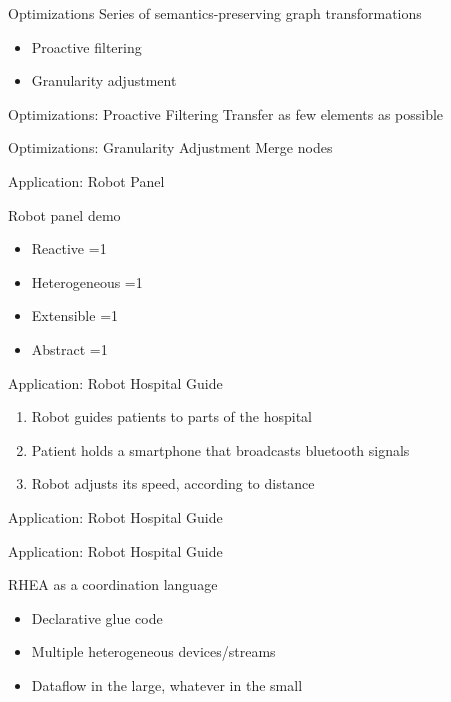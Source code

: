 \documentclass{beamer}
\newcommand{\done}{\ding{51}}
\newcommand{\checklist}[4]{
  \begin{frame}[standout]
	  \begin{itemize}
    \item Reactive \ifnum #1=1 \done \fi
    \item Heterogeneous \ifnum #2=1 \done \fi
    \item Extensible \ifnum #3=1 \done \fi
    \item Abstract \ifnum #4=1 \done \fi
    \end{itemize}
  \end{frame}
}
\begin{document}
	\begin{frame}{Optimizations}
	  Series of semantics-preserving graph transformations
	  \begin{itemize}
	  \item Proactive filtering
	  \item Granularity adjustment
	  \end{itemize}
	\end{frame}
	
	\begin{frame}{Optimizations: Proactive Filtering}
		Transfer as few elements as possible
	\end{frame}
	
	\begin{frame}{Optimizations: Granularity Adjustment}
	  Merge nodes
	\end{frame}
	
	\begin{frame}{Application: Robot Panel}
	\end{frame}
	
	\begin{frame}[standout]
	  Robot panel demo
	\end{frame}
	
	\checklist{1}{0}{1}{0}
	
	\begin{frame}{Application: Robot Hospital Guide}
	  \begin{enumerate}
	  \item Robot guides patients to parts of the hospital
	  \item Patient holds a smartphone that broadcasts bluetooth signals
	  \item Robot adjusts its speed, according to distance
	  \end{enumerate}
	\end{frame}
	\begin{frame}{Application: Robot Hospital Guide}
	\end{frame}
	\begin{frame}{Application: Robot Hospital Guide}
	\end{frame}
	
	\begin{frame}{RHEA as a coordination language}
	  \begin{itemize}
	  \item Declarative glue code
	  \item Multiple heterogeneous devices/streams
	  \item Dataflow in the large, whatever in the small
	  \end{itemize}
	\end{frame}
	
\end{document}
